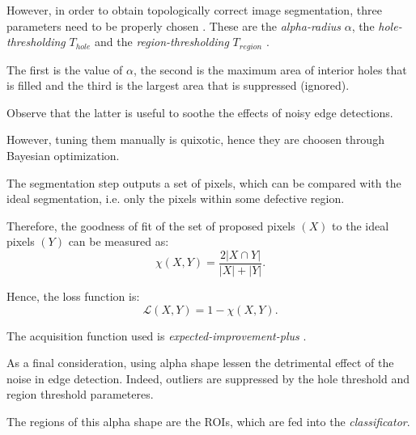         \par{
            However, in order to obtain topologically correct image segmentation, three parameters need to be properly chosen \cite{springer:10.1007/11907350_46}. These are the \emph{alpha-radius} $\alpha$, the \emph{hole-thresholding} $T_{hole}$ and the \emph{region-thresholding} $T_{region}$ \cite{matlab:alpha-shape}.
        }
        \par{
            The first is the value of $\alpha$, the second is the maximum area of interior holes that is filled and the third is the largest area that is suppressed (ignored).
        }
        \par{
            Observe that the latter is useful to soothe the effects of noisy edge detections.
        }
        \par{
            However, tuning them manually is quixotic, hence they are choosen through Bayesian optimization.
        }
        \par{
            The segmentation step outputs a set of pixels, which can be compared with the ideal segmentation, i.e. only the pixels within some defective region.
        }
        \par{
            Therefore, the goodness of fit of the set of proposed pixels $\left(X\right)$ to the ideal pixels $\left(Y\right)$ can be measured as:
            \begin{equation*}
                \chi\left(X, Y\right) = \frac{2 \lvert X \cap Y \rvert}{\lvert X \rvert + \lvert Y \rvert}.
            \end{equation*}
        }
        \par{
            Hence, the loss function is:
            \begin{equation*}
                \mathcal{L}\left(X, Y\right) = 1 - \chi\left(X, Y\right).
            \end{equation*}
        }
        \par{
            The acquisition function used is \emph{expected-improvement-plus} \cite{matlab:acquisition}.
        }
        \par{
            As a final consideration, using alpha shape lessen the detrimental effect of the noise in edge detection. Indeed, outliers are suppressed by the hole threshold and region threshold parameteres.
        }
        \par{
            The regions of this alpha shape are the ROIs, which are fed into the \emph{classificator}.
        }
